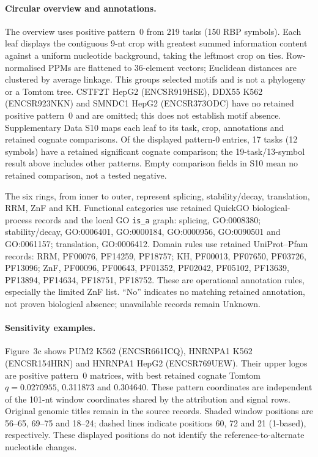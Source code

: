\documentclass[11pt]{article}
\begin{document}
\paragraph{Circular overview and annotations.} The overview uses positive pattern~0 from 219 tasks (150 RBP symbols). Each leaf displays the contiguous 9-nt crop with greatest summed information content against a uniform nucleotide background, taking the leftmost crop on ties. Row-normalised PPMs are flattened to 36-element vectors; Euclidean distances are clustered by average linkage. This groups selected motifs and is not a phylogeny or a Tomtom tree. CSTF2T HepG2 (ENCSR919HSE), DDX55 K562 (ENCSR923NKN) and SMNDC1 HepG2 (ENCSR373ODC) have no retained positive pattern~0 and are omitted; this does not establish motif absence. Supplementary Data S10 maps each leaf to its task, crop, annotations and retained cognate comparisons. Of the displayed pattern-0 entries, 17 tasks (12 symbols) have a retained significant cognate comparison; the 19-task/13-symbol result above includes other patterns. Empty comparison fields in S10 mean no retained comparison, not a tested negative.

The six rings, from inner to outer, represent splicing, stability/decay, translation, RRM, ZnF and KH. Functional categories use retained QuickGO biological-process records and the local GO \texttt{is\_a} graph: splicing, GO:0008380; stability/decay, GO:0006401, GO:0000184, GO:0000956, GO:0090501 and GO:0061157; translation, GO:0006412. Domain rules use retained UniProt--Pfam records: RRM, PF00076, PF14259, PF18757; KH, PF00013, PF07650, PF03726, PF13096; ZnF, PF00096, PF00643, PF01352, PF02042, PF05102, PF13639, PF13894, PF14634, PF18751, PF18752. These are operational annotation rules, especially the limited ZnF list. ``No'' indicates no matching retained annotation, not proven biological absence; unavailable records remain Unknown.

\paragraph{Sensitivity examples.} Figure~3c shows PUM2 K562 (ENCSR661ICQ), HNRNPA1 K562 (ENCSR154HRN) and HNRNPA1 HepG2 (ENCSR769UEW). Their upper logos are positive pattern~0 matrices, with best retained cognate Tomtom $q=0.0270955$, 0.311873 and 0.304640. These pattern coordinates are independent of the 101-nt window coordinates shared by the attribution and signal rows. Original genomic titles remain in the source records. Shaded window positions are 56--65, 69--75 and 18--24; dashed lines indicate positions 60, 72 and 21 (1-based), respectively. These displayed positions do not identify the reference-to-alternate nucleotide changes.
\end{document}
